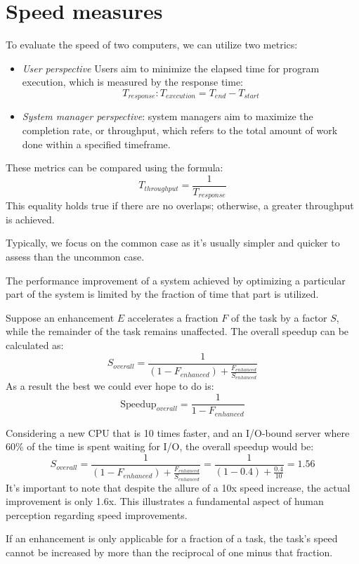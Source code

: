 \section{Speed measures}

To evaluate the speed of two computers, we can utilize two metrics:
\begin{itemize}
    \item \textit{User perspective} Users aim to minimize the elapsed time for program execution, which is measured by the response time: 
        \[T_{response} : T_{execution} = T_{end} - T_{start}\]
    \item \textit{System manager perspective}: system managers aim to maximize the completion rate, or throughput, which refers to the total amount of work done within a specified timeframe.
\end{itemize}
These metrics can be compared using the formula:
\[T_{throughput}=\dfrac{1}{T_{response}}\]
This equality holds true if there are no overlaps; otherwise, a greater throughput is achieved.

Typically, we focus on the common case as it's usually simpler and quicker to assess than the uncommon case.
\begin{theorem}
    The performance improvement of a system achieved by optimizing a particular part of the system is limited by the fraction of time that part is utilized.
\end{theorem}

Suppose an enhancement $E$ accelerates a fraction $F$ of the task by a factor $S$, while the remainder of the task remains unaffected.
The overall speedup can be calculated as:
\[S_{overall}=\dfrac{1}{\left(1-F_{enhanced}\right)+\frac{F_{enhanced}}{S_{enhanced}}}\]
As a result the best we could ever hope to do is: 
\[\text{Speedup}_{overall}=\dfrac{1}{1-F_{enhanced}}\]
\begin{example}
    Considering a new CPU that is 10 times faster, and an I/O-bound server where 60\% of the time is spent waiting for I/O, the overall speedup would be:
    \[S_{overall}=\dfrac{1}{\left(1-F_{enhanced}\right)+\frac{F_{enhanced}}{S_{enhanced}}}=\dfrac{1}{\left(1-0.4\right)+\frac{0.4}{10}}=1.56\]
    It's important to note that despite the allure of a 10x speed increase, the actual improvement is only 1.6x. 
    This illustrates a fundamental aspect of human perception regarding speed improvements.
\end{example}
\begin{corollary}
    If an enhancement is only applicable for a fraction of a task, the task's speed cannot be increased by more than the reciprocal of one minus that fraction.
\end{corollary}